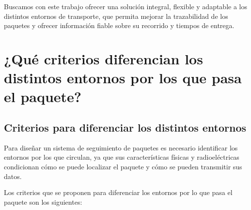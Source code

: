 \documentclass[11pt,a4paper]{article}
\begin{document}
Buscamos con este trabajo ofrecer una solución integral, flexible y adaptable a los distintos entornos de transporte, que permita mejorar la trazabilidad de los paquetes y ofrecer información fiable sobre su recorrido y tiempos de entrega.

\clearpage
\section{¿Qué criterios diferencian los distintos entornos por los que pasa el paquete?}
\label{sec:apartado2}

\subsection{Criterios para diferenciar los distintos entornos}
\label{sec:apartado2_1}

Para diseñar un sistema de seguimiento de paquetes es necesario identificar los entornos por los que circulan, ya que sus características físicas y radioeléctricas condicionan cómo se puede localizar el paquete y cómo se pueden transmitir sus datos.

Los criterios que se proponen para diferenciar los entornos por lo que pasa el paquete son los siguientes:
\end{document}
